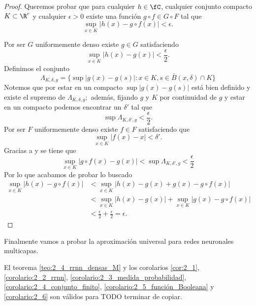 \begin{proof}
    Queremos probar que para cualquier $h \in \fC$, cualquier conjunto compacto $K \subset \R^r$ 
    y cualquier $\epsilon >0$
    existe una función $g \circ f \in G \circ F$ tal que 
    \begin{equation}
        \sup_{x \in K}|h(x) - g \circ f(x)| < \epsilon.
    \end{equation}

    Por ser $G$ uniformemente denso existe $g \in G$ satisfaciendo 
    \begin{equation}
        \sup_{x \in K}|h(x) - g(x)| < \frac{\epsilon}{2}.
    \end{equation}
    Definimos el conjunto 
    \begin{equation}
        \Lambda_{K, \delta, g} 
        = 
        \{
           \sup|g(x) - g(s)| : x \in K, s \in \bar{B}(x,\delta) \cap K 
        \}
    \end{equation}
    Notemos que por estar en un compacto $\sup|g(x) - g(s)|$ está bien definido 
    y existe el supremo de $\Lambda_{K, \delta, g};$ además, fijando $g$ y $K$ por continuidad de $g$
    y estar en un compacto podemos encontrar un $\delta'$ tal que 
    \begin{equation}\label{lema_A_6:supremo_lambda_delta_prima}
        \sup \Lambda_{K, \delta', g}  < \frac{\epsilon}{2}.
    \end{equation}
    Por ser $F$ uniformemente denso existe $f \in F$ satisfaciendo 
    que 
    \begin{equation}\label{lema_A_6:encontramos_f}
        \sup_{x \in K}|f(x) - x| < \delta'.
    \end{equation}
    Gracias a  y  se tiene que
    \begin{equation}
        \sup_{x \in K}|g \circ f(x) - g(x)| 
        < \sup \Lambda_{K, \delta', g} 
        < \frac{\epsilon}{2}
    \end{equation}
    Por lo que acabamos de probar lo buscado 
    \begin{align}
        \sup_{x \in K}|h(x) - g \circ f(x)| &
        < 
        \sup_{x \in K}|h(x) - g(x) + g(x) - g \circ f(x)| 
        \\ &
        < 
        \sup_{x \in K}|h(x) - g(x)|
        + 
        \sup_{x \in K}|g(x) - g \circ f(x)|  
        \\ &
        < 
        \frac{\epsilon}{2} + \frac{\epsilon}{2}
        = \epsilon.
    \end{align}
\end{proof}

Finalmente vamos a probar la aproximación universal 
para redes neuronales multicapas. 
\begin{corolario}
    El teorema
    \ref{teo:2_4_rrnn_densas_M} 
    y los corolarios
    \ref{cor:2_1}, 
    \ref{corolario:2_2_rrnn},
    \ref{corolario:2_3_medida_probabilidad},
    \ref{corolario:2_4_conjunto_finito},
    \ref{corolario:2_5_función_Booleana}
    y 
    \ref{corolario:2_6}
    son válidos para 
    TODO terminar de copiar. 
\end{corolario}